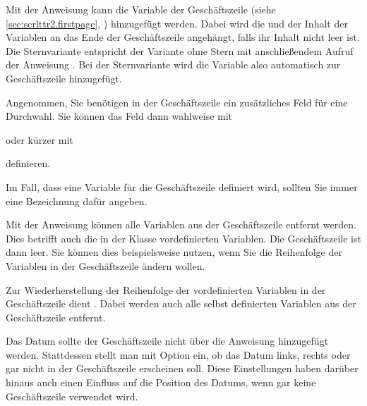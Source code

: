 Mit der Anweisung  kann die Variable  der
Geschäftszeile
(siehe \autoref{sec:scrlttr2.firstpage},
) hinzugefügt werden. Dabei wird die
 und der Inhalt der Variablen an das Ende der
Geschäftszeile angehängt, falls ihr Inhalt nicht leer ist. Die Sternvariante
 entspricht der Variante ohne Stern mit anschließendem
Aufruf der Anweisung . Bei der Sternvariante wird die
Variable also automatisch zur Geschäftszeile hinzugefügt.
\begin{Example}
  Angenommen, Sie benötigen in der Geschäftszeile ein zusätzliches Feld
  für eine Durchwahl. Sie können das Feld dann wahlweise mit
\begin{lstcode}
\end{lstcode}
  oder kürzer mit
\begin{lstcode}
\end{lstcode}
  definieren.
\end{Example}
Im Fall, dass eine Variable für die Geschäftszeile
definiert wird, sollten Sie immer eine Bezeichnung dafür angeben.

Mit der Anweisung  können alle Variablen aus der
Geschäftszeile entfernt werden. Dies betrifft auch die in der Klasse
vordefinierten Variablen. Die Geschäftszeile ist dann leer. Sie können dies
beispielsweise nutzen, wenn Sie die Reihenfolge der Variablen in der
Geschäftszeile ändern wollen.

Zur Wiederherstellung der Reihenfolge der vordefinierten Variablen in der
Geschäftszeile dient . Dabei werden auch alle
selbst definierten Variablen aus der Geschäftszeile entfernt.

Das Datum sollte der Geschäftszeile nicht über die
Anweisung  hinzugefügt werden. Stattdessen stellt man
mit Option %
%
%
%
 ein, ob das Datum links, rechts oder
gar nicht in der Geschäftszeile erscheinen soll. Diese Einstellungen haben
darüber hinaus auch einen Einfluss auf die Position des Datums, wenn gar keine
Geschäftszeile verwendet wird.%
%
\EndIndexGroup


